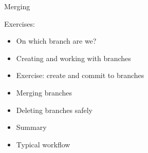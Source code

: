 \begin{frame}{Merging}

Exercises:

\begin{itemize}
 \item On which branch are we?
 \item Creating and working with branches
 \item Exercise: create and commit to branches
 \item Merging branches
 \item Deleting branches safely
 \item Summary
 \item Typical workflow
\end{itemize}

\end{frame}
